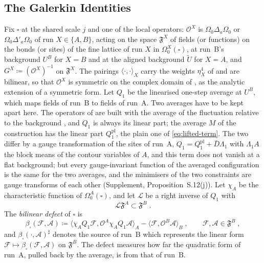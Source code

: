 \documentclass[11pt]{preprint}
\numberwithin{equation}{section}
\theoremstyle{definition}
\theoremstyle{remark}
\theoremstyle{plain}
\begin{document}
\subsection{The Galerkin Identities}\label{sec:galerkin}

Fix $\square$ at the shared scale $j$ and one of the local operators: $\mathcal O^X$ is $\Omega_0\Delta_a\Omega_0$ or $\Omega_0\Delta'_a\Omega_0$ of run $X \in \{ A, B \}$, acting on the space $\mathfrak F^X$ of fields (or functions) on the bonds (or sites) of the fine lattice of run $X$ in $\Omega_0^X(\square)$, at run~B's background $U^B$ for $X = B$ and at the aligned background $\tilde U$ for $X = A$, and $G^X \coloneqq (\mathcal O^X)^{-1}$ on $\mathfrak F^X$. The pairings $\langle\cdot, \cdot\rangle_X$ carry the weights $\eta_X^4$ of \cite[p.~393]{BalabanPBG} and are bilinear, so that $\mathcal O^X$ is symmetric on the complex domain of \cite[(3.37)]{BalabanPBG}, as the analytic extension of a symmetric form. Let $Q_1$ be the linearised one-step average at $U^B$, which maps fields of run~B to fields of run~A. Two averages have to be kept apart here. The operators of \cite{BalabanPBG} are built with the average of the fluctuation relative to the background \cite[(3.13), p.~392; (3.113), p.~418]{BalabanPBG}, and $Q_1$ is always its linear part; the average $M$ of the construction has the linear part $Q^{\mathrm{pl}}_1$, the plain one of \eqref{eq:lifted-term}. The two differ by a gauge transformation of the sites of run~A, $Q_1 = Q^{\mathrm{pl}}_1 + \bar D\Lambda_1$ with $\Lambda_1A$ the block means of the contour variables of $A$, and this term does not vanish at a flat background; but every gauge-invariant function of the averaged configuration is the same for the two averages, and the minimisers of the two constraints are gauge transforms of each other (Supplement, Proposition~S.12(j)). Let $\chi_A$ be the characteristic function of $\Omega^A_0(\square)$, and let $\mathcal L$ be a right inverse of $Q_1$ with
\begin{equation}\label{eq:lift-support}
    \mathcal L\mathfrak F^A \subset \mathfrak F^B\;.
\end{equation}
The \emph{bilinear defect} of $\square$ is
\begin{equation}\label{eq:bilinear-defect}
    \beta_\square(\mathcal F, \mathcal A) \coloneqq \langle\chi_AQ_1\mathcal F, \mathcal O^A\chi_AQ_1\mathcal A\rangle_A - \langle\mathcal F, \mathcal O^B\mathcal A\rangle_B\;,
    \qquad \mathcal F, \mathcal A \in \mathfrak F^B\;,
\end{equation}
and $\beta_\square(\cdot, \mathcal A)^\sharp$ denotes the source of run~B which represents the linear form $\mathcal F \mapsto \beta_\square(\mathcal F, \mathcal A)$ on $\mathfrak F^B$. The defect measures how far the quadratic form of run~A, pulled back by the average, is from that of run~B.
\end{document}
